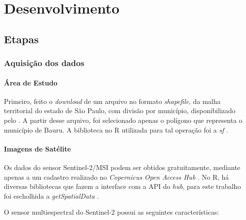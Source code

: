 
\chapter{Desenvolvimento}\label{desenvolvimento}

\section{Etapas}\label{etapas}

\subsection{Aquisição dos dados}\label{aquisicao-dos-dados}

\subsubsection{Área de Estudo}\label{area-de-estudo}

Primeiro, feito o \emph{download} de um arquivo no
formato \emph{shapefile}, da malha territorial do estado de São Paulo,
com divisão por município, disponibilizado pelo  \cite{ibge-malha}. A partir desse arquivo, foi selecionado apenas o polígono que representa o município de Bauru. A biblioteca no R utilizada para tal operação foi a \textit{sf} \cite{sf}.

\subsubsection{Imagens de Satélite}\label{imagens-de-satelite}

Os dados do sensor Sentinel-2/MSI podem ser obtidos gratuitamente, mediante apenas a um cadastro realizado no \textit{Copernicus Open Access Hub} \cite{sentinel-data}. No R, há diversas bibliotecas que fazem a interface com a API do \textit{hub}, para este trabalho foi escholhida a \textit{getSpatialData} \cite{getSpatialData}. 
    
    O sensor multiespectral do Sentinel-2 possui as seguintes características:

